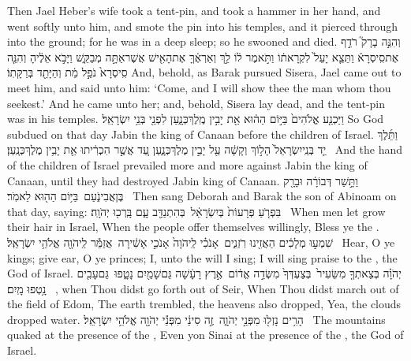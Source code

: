 {Then Jael Heber’s wife took a tent-pin, and took a hammer in her hand, and went softly unto him, and smote the pin into his temples, and it pierced through into the ground; for he was in a deep sleep; so he swooned and died.}
{וְהִנֵּ֣ה בָרָק֮ רֹדֵ֣ף אֶת\maqqaf סִֽיסְרָא֒ וַתֵּצֵ֤א יָעֵל֙ לִקְרָאת֔וֹ וַתֹּ֣אמֶר ל֔וֹ לֵ֣ךְ וְאַרְאֶ֔ךָּ אֶת\maqqaf הָאִ֖ישׁ אֲשֶׁר\maqqaf אַתָּ֣ה מְבַקֵּ֑שׁ וַיָּבֹ֣א אֵלֶ֔יהָ וְהִנֵּ֤ה סִֽיסְרָא֙ נֹפֵ֣ל מֵ֔ת וְהַיָּתֵ֖ד בְּרַקָּתֽוֹ׃}
{And, behold, as Barak pursued Sisera, Jael came out to meet him, and said unto him: ‘Come, and I will show thee the man whom thou seekest.’ And he came unto her; and, behold, Sisera lay dead, and the tent-pin was in his temples.}
{וַיַּכְנַ֤ע אֱלֹהִים֙ בַּיּ֣וֹם הַה֔וּא אֵ֖ת יָבִ֣ין מֶֽלֶךְ\maqqaf כְּנָ֑עַן לִפְנֵ֖י בְּנֵ֥י יִשְׂרָאֵֽל׃}
{So God subdued on that day Jabin the king of Canaan before the children of Israel.}
{וַתֵּ֜לֶךְ יַ֤ד בְּנֵֽי\maqqaf יִשְׂרָאֵל֙ הָל֣וֹךְ וְקָשָׁ֔ה עַ֖ל יָבִ֣ין מֶלֶךְ\maqqaf כְּנָ֑עַן עַ֚ד אֲשֶׁ֣ר הִכְרִ֔יתוּ אֵ֖ת יָבִ֥ין מֶלֶךְ\maqqaf כְּנָֽעַן׃ \petucha }
{And the hand of the children of Israel prevailed more and more against Jabin the king of Canaan, until they had destroyed Jabin king of Canaan.}
\newperek
{}
{וַתָּ֣שַׁר דְּבוֹרָ֔ה וּבָרָ֖ק בֶּן\maqqaf אֲבִינֹ֑עַם \setuma  בַּיּ֥וֹם הַה֖וּא לֵאמֹֽר׃ \setuma }
{Then sang Deborah and Barak the son of Abinoam on that day, saying:}
{בִּפְרֹ֤עַ פְּרָעוֹת֙ בְּיִשְׂרָאֵ֔ל \setuma  בְּהִתְנַדֵּ֖ב עָ֑ם בָּֽרְכ֖וּ יְהֹוָֽה׃ \setuma }
{When men let grow their hair in Israel, When the people offer themselves willingly, Bless ye the \lord.}
{שִׁמְע֣וּ מְלָכִ֔ים הַאֲזִ֖ינוּ רֹֽזְנִ֑ים \setuma  אָנֹכִ֗י לַֽיהֹוָה֙ אָנֹכִ֣י אָשִׁ֔ירָה \setuma  אֲזַמֵּ֕ר לַֽיהֹוָ֖ה אֱלֹהֵ֥י יִשְׂרָאֵֽל׃ \setuma }
{Hear, O ye kings; give ear, O ye princes; I, unto the \lord\space will I sing; I will sing praise to the \lord, the God of Israel.}
{יְהֹוָ֗ה בְּצֵאתְךָ֤ מִשֵּׂעִיר֙ \setuma  בְּצַעְדְּךָ֙ מִשְּׂדֵ֣ה אֱד֔וֹם \setuma  אֶ֣רֶץ רָעָ֔שָׁה גַּם\maqqaf שָׁמַ֖יִם נָטָ֑פוּ \setuma  גַּם\maqqaf עָבִ֖ים נָ֥טְפוּ מָֽיִם׃ \setuma }
{\lord, when Thou didst go forth out of Seir, When Thou didst march out of the field of Edom, The earth trembled, the heavens also dropped, Yea, the clouds dropped water.}
{הָרִ֥ים נָזְל֖וּ מִפְּנֵ֣י יְהֹוָ֑ה \setuma  זֶ֣ה סִינַ֔י מִפְּנֵ֕י יְהֹוָ֖ה אֱלֹהֵ֥י יִשְׂרָאֵֽל׃ \setuma }
{The mountains quaked at the presence of the \lord, Even yon Sinai at the presence of the \lord, the God of Israel.}
